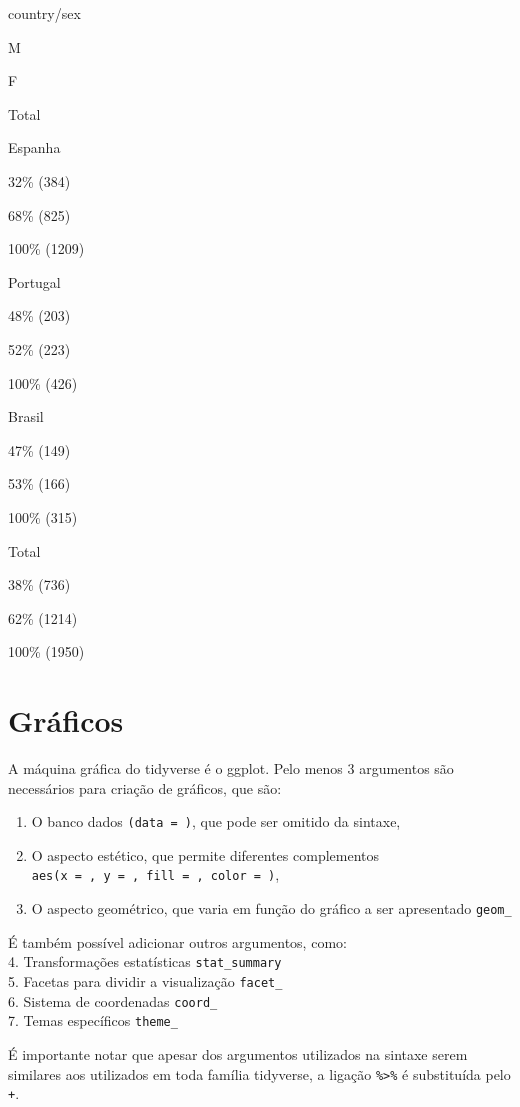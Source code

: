 \documentclass[
]{book}
\providecommand{\tightlist}{%
  \setlength{\itemsep}{0pt}\setlength{\parskip}{0pt}}
\begin{document}
country/sex

M

F

Total

Espanha

32\% (384)

68\% (825)

100\% (1209)

Portugal

48\% (203)

52\% (223)

100\% (426)

Brasil

47\% (149)

53\% (166)

100\% (315)

Total

38\% (736)

62\% (1214)

100\% (1950)

\hypertarget{gruxe1ficos}{%
\section{Gráficos}\label{gruxe1ficos}}

A máquina gráfica do tidyverse é o ggplot. Pelo menos 3 argumentos são necessários para criação de gráficos, que são:

\begin{enumerate}
\def\labelenumi{\arabic{enumi}.}
\tightlist
\item
  O banco dados \texttt{(data\ =\ )}, que pode ser omitido da sintaxe,\\
\item
  O aspecto estético, que permite diferentes complementos \texttt{aes(x\ =\ ,\ y\ =\ ,\ fill\ =\ ,\ color\ =\ )},\\
\item
  O aspecto geométrico, que varia em função do gráfico a ser apresentado \texttt{geom\_}
\end{enumerate}

É também possível adicionar outros argumentos, como:\\
4. Transformações estatísticas \texttt{stat\_summary}\\
5. Facetas para dividir a visualização \texttt{facet\_}\\
6. Sistema de coordenadas \texttt{coord\_}\\
7. Temas específicos \texttt{theme\_}

É importante notar que apesar dos argumentos utilizados na sintaxe serem similares aos utilizados em toda família tidyverse, a ligação \texttt{\%\textgreater{}\%} é substituída pelo \texttt{+}.
\end{document}
